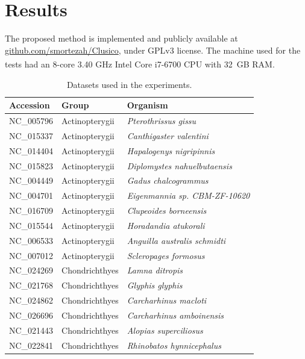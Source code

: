 \documentclass[extendedabs]{recpad2k}
\begin{document}
\section{Results}
The proposed method is implemented and publicly available at \url{github.com/smortezah/Clusico}, under GPLv3 license. The machine used for the tests had an 8-core 3.40 GHz Intel\textsuperscript{\scriptsize\textregistered} Core{\scriptsize\texttrademark} i7-6700 CPU with 32~GB RAM.

\begin{table}[b!]
   \caption{Datasets used in the experiments.}
   \label{tab.dataset}
   \centering
   \vspace{3mm}
   \begin{tabular}{lll}
      \hline
      Accession & Group & Organism \\
      \hline
      NC\_005796 & Actinopterygii & \textit{Pterothrissus gissu} \\
      NC\_015337 & Actinopterygii & \textit{Canthigaster valentini} \\
      NC\_014404 & Actinopterygii & \textit{Hapalogenys nigripinnis} \\
      NC\_015823 & Actinopterygii & \textit{Diplomystes nahuelbutaensis} \\
      NC\_004449 & Actinopterygii & \textit{Gadus chalcogrammus} \\
      NC\_004701 & Actinopterygii & \textit{Eigenmannia sp. CBM-ZF-10620} \\
      NC\_016709 & Actinopterygii & \textit{Clupeoides borneensis} \\
      NC\_015544 & Actinopterygii & \textit{Horadandia atukorali} \\
      NC\_006533 & Actinopterygii & \textit{Anguilla australis schmidti} \\
      NC\_007012 & Actinopterygii & \textit{Scleropages formosus} \\
      NC\_024269 & Chondrichthyes & \textit{Lamna ditropis} \\
      NC\_021768 & Chondrichthyes & \textit{Glyphis glyphis} \\
      NC\_024862 & Chondrichthyes & \textit{Carcharhinus macloti} \\
      NC\_026696 & Chondrichthyes & \textit{Carcharhinus amboinensis} \\
      NC\_021443 & Chondrichthyes & \textit{Alopias superciliosus} \\
      NC\_022841 & Chondrichthyes & \textit{Rhinobatos hynnicephalus} \\

\end{tabular}
\end{table}
\end{document}
